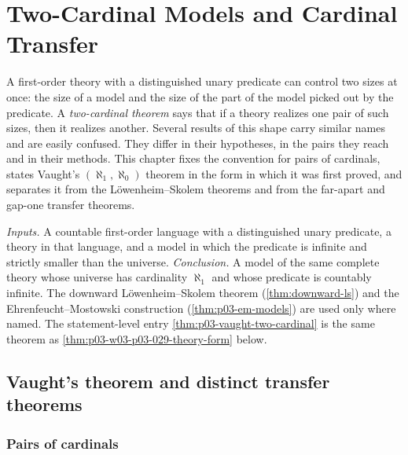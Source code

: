 \chapter{Two-Cardinal Models and Cardinal Transfer}
\label{sec:p03-w03-p03-029-two-cardinal}

A first-order theory with a distinguished unary predicate can control two
sizes at once: the size of a model and the size of the part of the model
picked out by the predicate. A \emph{two-cardinal theorem} says that if a
theory realizes one pair of such sizes, then it realizes another. Several
results of this shape carry similar names and are easily confused. They
differ in their hypotheses, in the pairs they reach and in their methods. This
chapter fixes the convention for pairs of cardinals, states Vaught's
\((\aleph_1,\aleph_0)\) theorem in the form in which it was first proved, and
separates it from the L\"owenheim--Skolem theorems and from the far-apart and
gap-one transfer theorems.

\emph{Inputs.} A countable first-order language with a distinguished unary
predicate, a theory in that language, and a model in which the predicate is
infinite and strictly smaller than the universe. \emph{Conclusion.} A model
of the same complete theory whose universe has cardinality \(\aleph_1\) and
whose predicate is countably infinite. The downward L\"owenheim--Skolem
theorem (\cref{thm:downward-ls}) and the Ehrenfeucht--Mostowski construction
(\cref{thm:p03-em-models}) are used only where named. The statement-level
entry \cref{thm:p03-vaught-two-cardinal} is the same theorem as
\cref{thm:p03-w03-p03-029-theory-form} below.

\section{Vaught's theorem and distinct transfer theorems}
\label{sec:p03-w03-p03-029-vaught}

\subsection{Pairs of cardinals}

